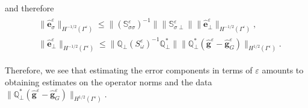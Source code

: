 \documentclass[]{article}
\numberwithin{equation}{section}
\numberwithin{theorem}{section}
\numberwithin{lemma}{section}
\numberwithin{corollary}{section}
\numberwithin{proposition}{section}
\numberwithin{definition}{section}
\newcommand{\re}{\varepsilon}
\renewcommand{\vec}{\boldsymbol}
\begin{document}
	and therefore
	\begin{align}
		\label{eq:error_bounds}
		\begin{split}
			&\| \hat{\vec{e}}^{\re}_{\sigma} \|_{H^{-1/2}(\Gamma^{\re})} \leq \| (\mathbb{S}^{\re}_{\sigma \sigma})^{-1} \| \| \mathbb{S}^{\re}_{ \sigma \perp } \| \| \hat{\vec{e}}^{\re}_{\perp} \|_{H^{-1/2}(\Gamma^{\re})}, \\
			&\| \hat{\vec{e}}^{\re}_{\perp} \|_{H^{-1/2}(\Gamma^{\re})} \leq \| \mathbb{Q}_{\perp} (S^{\re}_{\omega})^{-1} \mathbb{Q}^*_{\perp} \| \| \mathbb{Q}^*_{\perp} (\hat{\vec{g}}^{\re} - \hat{\vec{g}}^{\re}_G) \|_{H^{1/2}(\Gamma^{\re})}. 
		\end{split}
	\end{align}
	
	Therefore, we see that estimating the error components in terms of $\re$ amounts to obtaining estimates on the operator norms and the data $\|\mathbb{Q}_{\perp}^*(\hat{\vec{g}}^{\re}-\hat{\vec{g}}_G^{\re})\|_{H^{1/2}(\Gamma^{\re})}$. 	
	
\end{document}

